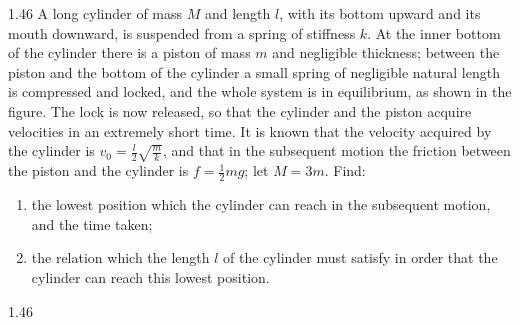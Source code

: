 \begin{problem}{1.46}
A long cylinder of mass $M$ and length $l$, with its bottom upward and its mouth downward, is suspended from a spring of stiffness $k$. At the inner bottom of the cylinder there is a piston of mass $m$ and negligible thickness; between the piston and the bottom of the cylinder a small spring of negligible natural length is compressed and locked, and the whole system is in equilibrium, as shown in the figure. The lock is now released, so that the cylinder and the piston acquire velocities in an extremely short time. It is known that the velocity acquired by the cylinder is $v_0=\frac{l}{2}\sqrt{\frac{m}{k}}$, and that in the subsequent motion the friction between the piston and the cylinder is $f=\frac{1}{2}mg$; let $M=3m$. Find:
\begin{enumerate}[label=(\arabic*),leftmargin=2.2em,itemsep=1pt,topsep=2pt]
\item the lowest position which the cylinder can reach in the subsequent motion, and the time taken;
\item the relation which the length $l$ of the cylinder must satisfy in order that the cylinder can reach this lowest position.
\end{enumerate}
\end{problem}

\begin{figbox}{1.46}
\end{figbox}

